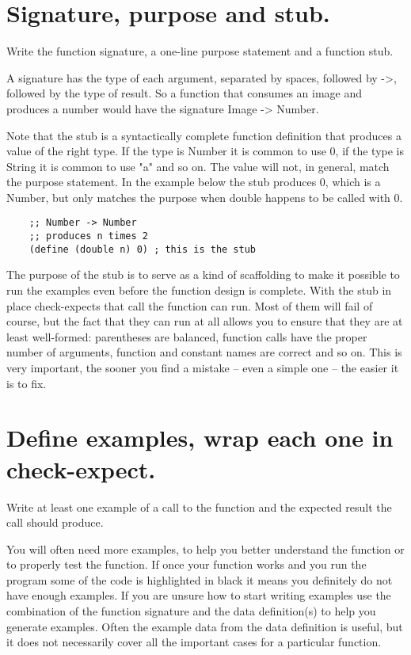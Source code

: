 \documentclass[11pt,a4paper]{report}
\begin{document}
	\section{Signature, purpose and stub.}
	Write the function signature, a one-line purpose statement and a function stub.
	
	A signature has the type of each argument, separated by spaces, followed by ->, followed by the
	type of result. So a function that consumes an image and produces a number would have the
	signature Image -> Number.
	
	Note that the stub is a syntactically complete function definition that produces a value of the right
	type. If the type is Number it is common to use 0, if the type is String it is common to use "a" and
	so on. The value will not, in general, match the purpose statement. In the example below the stub
	produces 0, which is a Number, but only matches the purpose when double happens to be called
	with 0.
	
	\begin{verbatim}
	;; Number -> Number
	;; produces n times 2
	(define (double n) 0) ; this is the stub
	\end{verbatim}
	
	The purpose of the stub is to serve as a kind of scaffolding to make it possible to run the
	examples even before the function design is complete. With the stub in place check-expects that
	call the function can run. Most of them will fail of course, but the fact that they can run at all
	allows you to ensure that they are at least well-formed: parentheses are balanced, function calls 
	have the proper number of arguments, function and constant names are correct and so on. This is 
	very important, the sooner you find a mistake -- even a simple one -- the easier it is to fix.
	
	\section{Define examples, wrap each one in check-expect.}
	Write at least one example of a call to the function and the expected result the call should
	produce.
	
	You will often need more examples, to help you better understand the function or to properly test
	the function. If once your function works and you run the program some of the code is
	highlighted in black it means you definitely do not have enough examples. If you are unsure how
	to start writing examples use the combination of the function signature and the data definition(s)
	to help you generate examples. Often the example data from the data definition is useful, but it
	does not necessarily cover all the important cases for a particular function.
	
\end{document}
